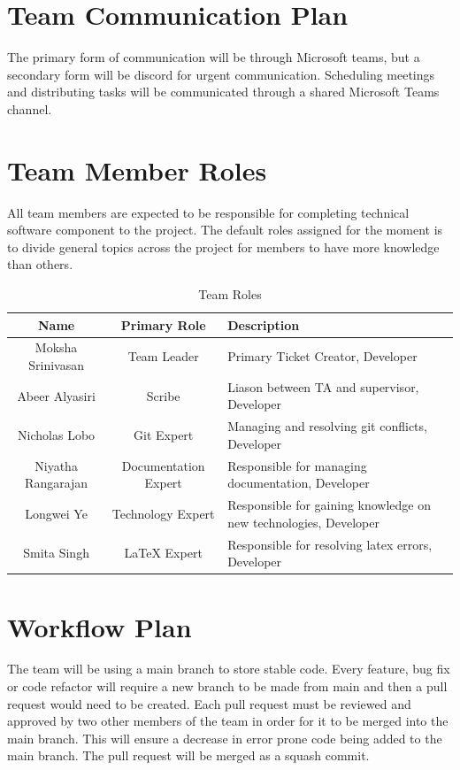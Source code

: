 \documentclass{article}
\begin{document}
\section{Team Communication Plan}
The primary form of communication will be through Microsoft teams, but a secondary form will be discord for urgent communication. Scheduling meetings and distributing tasks will be communicated through a shared Microsoft Teams channel. %

\section{Team Member Roles} 
All team members are expected to be responsible for completing technical software component to the project. The default roles assigned for the moment is to divide general topics across the project for members to have more knowledge than others. 
\begin{table}[H]
    \centering
    \begin{tabular}{|c|c|p{60mm}|}
         \hline
         Name & Primary Role & Description\\
         \hline
         Moksha Srinivasan & Team Leader & Primary Ticket Creator, Developer\\
         \hline
         Abeer Alyasiri & Scribe & Liason between TA and supervisor, Developer\\
         \hline
         Nicholas Lobo & Git Expert & Managing and resolving git conflicts, Developer \\
         \hline
         Niyatha Rangarajan & Documentation Expert & Responsible for managing documentation, Developer \\
         \hline
         Longwei Ye & Technology Expert & Responsible for gaining knowledge on new technologies, Developer  \\
         \hline
         Smita Singh & LaTeX Expert & Responsible for resolving latex errors, Developer \\
         \hline
    \end{tabular}
    \caption{Team Roles}
    \label{tab:team_roles}
\end{table}

\section{Workflow Plan} %

The team will be using a main branch to store stable code. Every feature, bug fix or code refactor will require a new branch to be made from main and then a pull request would need to be created. Each pull request must be reviewed and approved by two other members of the team in order for it to be merged into the main branch. This will ensure a decrease in error prone code being added to the main branch. The pull request will be merged as a squash commit.
\end{document}

